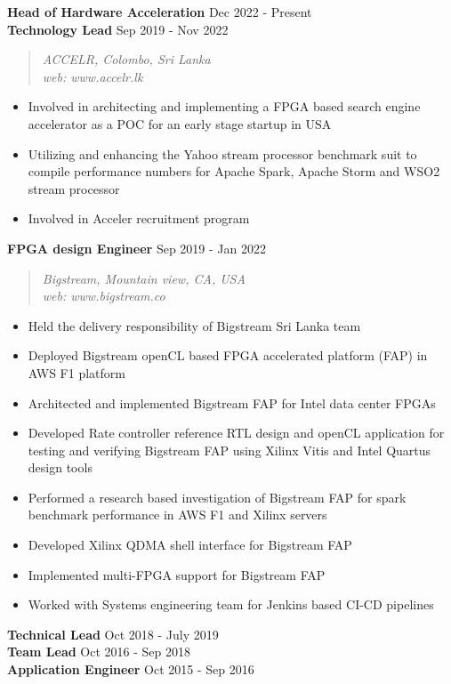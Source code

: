 \documentclass[mm]{res} %
\begin{document}
\begin{resume}
\textbf{Head of Hardware Acceleration} \hfill Dec 2022 - Present\\
\textbf{Technology Lead} \hfill Sep 2019 - Nov 2022
\begin{quote}
	\emph{ACCELR, Colombo, Sri Lanka \\
		web: www.accelr.lk}
\end{quote}
\begin{itemize} \itemsep -1pt 
\item Involved in architecting and implementing a FPGA based search engine accelerator as a POC for an early stage startup in USA
\item Utilizing and enhancing the Yahoo stream processor benchmark suit to compile performance numbers for  Apache Spark, Apache Storm and WSO2 stream processor
\item Involved in Acceler recruitment program
\end{itemize}
\textbf{FPGA design Engineer} \hfill Sep 2019 - Jan 2022
\begin{quote}
	\emph{Bigstream, Mountain view, CA, USA\\
		  web: www.bigstream.co}
\end{quote}
\begin{itemize} \itemsep -1pt 
	\item Held the delivery responsibility of Bigstream Sri Lanka team
	\item Deployed Bigstream openCL based FPGA accelerated platform (FAP) in AWS F1 platform
	\item Architected and implemented Bigstream FAP for Intel data center FPGAs
	\item Developed Rate controller reference RTL design and openCL application for testing and verifying Bigstream FAP using Xilinx Vitis and Intel Quartus design tools
	\item Performed a research based investigation of Bigstream FAP for spark benchmark performance in AWS F1 and Xilinx servers
	\item Developed Xilinx QDMA shell interface for Bigstream FAP
	\item Implemented multi-FPGA support for Bigstream FAP
	\item Worked with Systems engineering team for Jenkins based CI-CD pipelines
\end{itemize}
\textbf{Technical Lead} \hfill Oct 2018 - July 2019\\
\textbf{Team Lead} \hfill Oct 2016 - Sep 2018\\
\textbf{Application Engineer} \hfill Oct 2015 - Sep 2016

\end{resume}
\end{document}
